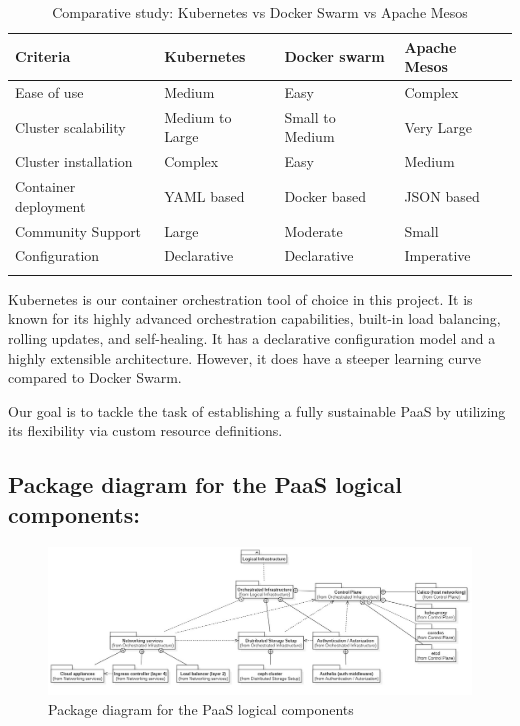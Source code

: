 \begin{longtable}[H]{|m{3.5cm}|m{3.5cm}|m{3.5cm}|m{3.5cm}|}
\hline
Criteria & Kubernetes & Docker swarm & Apache Mesos  \\
\endhead
\hline
Ease of use & Medium & Easy & Complex  \\
\hline
Cluster scalability & Medium to Large & Small to Medium & Very Large  \\
\hline
Cluster installation & Complex & Easy & Medium  \\
\hline
Container deployment & YAML based  & Docker based & JSON based \\
\hline
\pagebreak
\hline
Community Support  & Large  & Moderate  & Small \\
\hline
Configuration & Declarative  & Declarative & Imperative \\
\hline
\caption{Comparative study: Kubernetes vs Docker Swarm vs Apache Mesos}
\end{longtable}

\hspace{7mm}Kubernetes is our container orchestration tool of choice in this project. It is known for its highly advanced orchestration capabilities, built-in load balancing, rolling updates, and self-healing. It has a declarative configuration model and a highly extensible architecture. However, it does have a steeper learning curve compared to Docker Swarm.  

\hspace{7mm}Our goal is to tackle the task of establishing a fully sustainable PaaS by utilizing its flexibility via custom resource definitions. 

\subsection{Package diagram for the PaaS logical components:}

\begin{figure}[H]\centering
\includegraphics[width=1.0\textwidth,angle=00]{assets/f12.jpg}
\caption{Package diagram for the PaaS logical components}
\label{fig:Package diagram for the PaaS logical components}
\end{figure}


